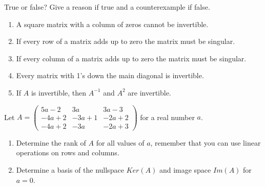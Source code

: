 \documentclass[11pt,nocut]{article}
\begin{document}


\vspace{1cm}

\begin{problem}[2.5 points]
True or false? Give a reason if true and a counterexample if false.
\begin{enumerate}[label=\normalfont(\textbf{\alph*})]
  \item A square matrix with a column of zeros cannot be invertible.
  \item If every row of a matrix adds up to zero the matrix must be singular.
  \item If every column of a matrix adds up to zero the matrix must be singular.
  \item Every matrix with 1's down the main diagonal is invertible.
  \item If $A$ is invertible, then $A^{-1}$ and $A^2$ are invertible.
\end{enumerate}
\end{problem}

\begin{problem}[2.5 points]
    Let $ A = \begin{pmatrix}
        5a - 2 & 3a & 3a-3 \\
        -4a + 2 & -3a + 1 & -2a + 2 \\
        -4a + 2 & -3a & -2a + 3
    \end{pmatrix}
    $ for a real number $a$.
    \begin{enumerate}[label=\normalfont(\textbf{\alph*})]
        \item Determine the rank of $A$ for all values of $a$, remember that you can use linear operations on rows and columns.
        \item Determine a basis of the nullspace $Ker(A)$ and image space $Im(A)$ for $a = 0$.
    \end{enumerate}
\end{problem}
\end{document}
